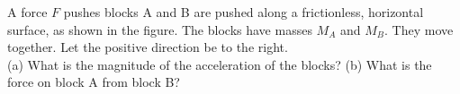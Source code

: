 A force $F$ pushes blocks A and B are pushed along a frictionless, horizontal
surface, as shown in the figure. The blocks have masses $M_A$ and $M_B$.
They move together. Let the positive direction be to the right.\\
%
(a) What is the magnitude of the acceleration of the blocks?\answercheck\hwendpart
%
(b) What is the force on block A from block B?\answercheck

